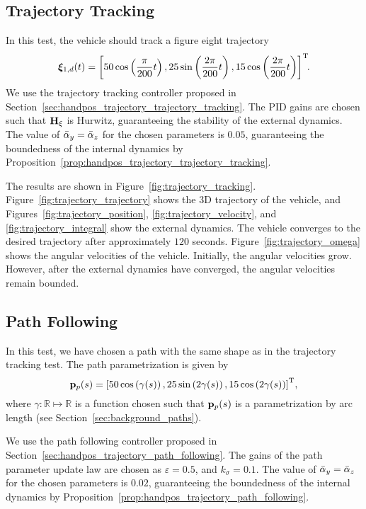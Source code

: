 \subsection{Trajectory Tracking}
In this test, the vehicle should track a figure eight trajectory
\begin{equation}
    \bm{\xi}_{1, d}(t) = \left[50\cos\left(\frac{\pi}{200}t\right), 25\sin\left(\frac{2\pi}{200}t\right), 15\cos\left(\frac{2\pi}{200}t\right)\right]^{\mathrm{T}}\!\!.
\end{equation}
We use the trajectory tracking controller proposed in Section~\ref{sec:handpos_trajectory_trajectory_tracking}.
The PID gains are chosen such that $\mathbf{H}_{\xi}$ is Hurwitz, guaranteeing the stability of the external dynamics.
The value of $\Bar{\alpha}_y = \Bar{\alpha}_z$ for the chosen parameters is $0.05$, guaranteeing the boundedness of the internal dynamics by Proposition~\ref{prop:handpos_trajectory_trajectory_tracking}.

The results are shown in Figure~\ref{fig:trajectory_tracking}.
Figure~\ref{fig:trajectory_trajectory} shows the 3D trajectory of the vehicle, and Figures~\ref{fig:trajectory_position}, \ref{fig:trajectory_velocity}, and \ref{fig:trajectory_integral} show the external dynamics.
The vehicle converges to the desired trajectory after approximately $120$ seconds.
Figure~\ref{fig:trajectory_omega} shows the angular velocities of the vehicle.
Initially, the angular velocities grow.
However, after the external dynamics have converged, the angular velocities remain bounded.

\subsection{Path Following}


In this test, we have chosen a path with the same shape as in the trajectory tracking test.
The path parametrization is given by
\begin{equation}
    \mathbf{p}_p(s) = \left[50\cos\left(\gamma(s)\right), 25\sin\left(2\gamma(s)\right), 15\cos\left(2\gamma(s)\right)\right]^{\mathrm{T}}\!,
\end{equation}
where $\gamma: \mathbb{R} \mapsto \mathbb{R}$ is a function chosen such that $\mathbf{p}_p(s)$ is a parametrization by arc length (see Section~\ref{sec:background_paths}).

We use the path following controller proposed in Section~\ref{sec:handpos_trajectory_path_following}.
The gains of the path parameter update law are chosen as $\varepsilon = 0.5$, and $k_{\sigma} = 0.1$.
The value of $\Bar{\alpha}_y = \Bar{\alpha}_z$ for the chosen parameters is $0.02$, guaranteeing the boundedness of the internal dynamics by Proposition~\ref{prop:handpos_trajectory_path_following}.

